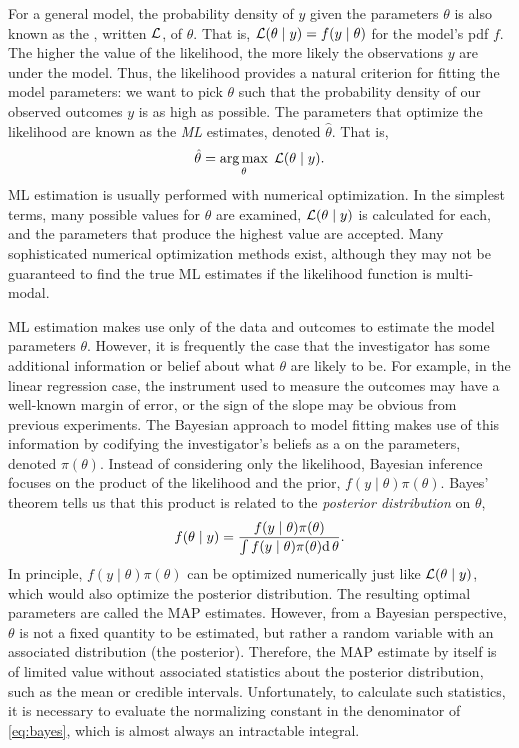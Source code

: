 For a general model, the probability density of $y$ given the parameters
$\theta$ is also known as the , written $\mathcal{L}$, of $\theta$.
That is, $\mathcal{L}(\theta \mid y) = f(y \mid \theta)$ for the model's \gls{pdf} $f$.
The higher the value of the likelihood, the more likely the observations $y$
are under the model. Thus, the likelihood provides a natural criterion for
fitting the model parameters: we want to pick $\theta$ such that the
probability density of our observed outcomes $y$ is as high as possible. The
parameters that optimize the likelihood are known as the \textit{\gls{ML}}
estimates, denoted $\hat{\theta}$. That is,
\[
  \hat{\theta} = \operatorname*{arg\,max}_\theta\; \mathcal{L}(\theta \mid y).
\]
\Gls{ML} estimation is usually performed with numerical optimization. In the
simplest terms, many possible values for $\theta$ are examined, $\mathcal{L}(\theta \mid
y)$ is calculated for each, and the parameters that produce the highest value
are accepted. Many sophisticated numerical optimization methods exist, although
they may not be guaranteed to find the true \gls{ML} estimates if the
likelihood function is multi-modal. 

\Gls{ML} estimation makes use only of the data and outcomes to estimate the
model parameters $\theta$. However, it is frequently the case that the
investigator has some additional information or belief about what $\theta$ are
likely to be. For example, in the linear regression case, the instrument used
to measure the outcomes may have a well-known margin of error, or the sign of
the slope may be obvious from previous experiments. The Bayesian approach to
model fitting makes use of this information by codifying the investigator's
beliefs as a  on the parameters, denoted
$\pi(\theta)$. Instead of considering only the likelihood, Bayesian inference
focuses on the product of the likelihood and the prior, $f(y \mid \theta)
\pi(\theta)$. Bayes' theorem tells us that this product is related to the
\textit{posterior distribution} on $\theta$,
\begin{align}
  f(\theta \mid y) 
    = \frac{f(y \mid \theta) \pi(\theta)}
           {\int f(y \mid \theta) \pi(\theta) \mathrm{d}\, \theta}.
  \label{eq:bayes}
\end{align}
In principle, $f(y \mid \theta) \pi(\theta)$ can be optimized numerically just
like $\mathcal{L}(\theta \mid y)$, which would also optimize the posterior distribution.
The resulting optimal parameters are called the \gls{MAP} estimates. However,
from a Bayesian perspective, $\theta$ is not a fixed quantity to be estimated,
but rather a random variable with an associated distribution (the posterior).
Therefore, the \gls{MAP} estimate by itself is of limited value without
associated statistics about the posterior distribution, such as the mean or
credible intervals. Unfortunately, to calculate such statistics, it is
necessary to evaluate the normalizing constant in the denominator of
\cref{eq:bayes}, which is almost always an intractable integral.

